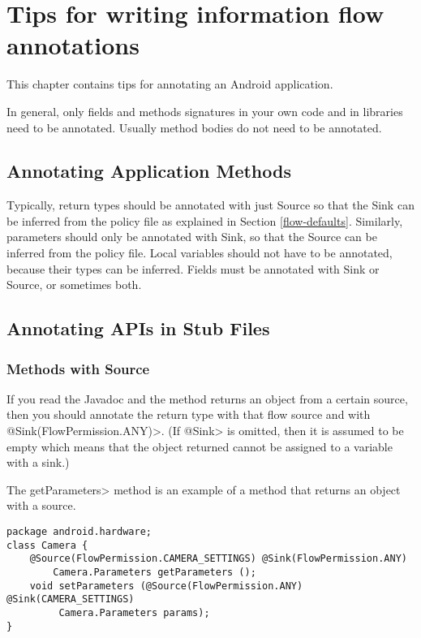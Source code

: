 \htmlhr
\chapter{Tips for writing information flow annotations\label{app-annotation}}

This chapter contains tips for annotating an Android application.

In general, only fields and methods signatures in your own code and in
libraries need to be annotated. Usually method bodies do not need to be
annotated.


\section{Annotating Application Methods\label{sec:annomethods}}

Typically, return types should be annotated with just Source so that the Sink can be
 inferred from the policy file as explained in Section \ref{flow-defaults}. Similarly, parameters should
  only be annotated with Sink, so that the Source can be inferred from  the policy file.
    Local variables should not have to be annotated, because their types can be inferred. Fields 
    must be annotated with  Sink or Source, or sometimes both. 

\section{Annotating APIs in Stub Files\label{sec:annoAPI}}

\subsection{Methods with Source}
If you read the Javadoc and the method returns an object from a certain source, then you should annotate
the return type with that flow source and with \<@Sink(FlowPermission.ANY)>.  (If \<@Sink> is omitted, then it is assumed to be empty
 which means that the object returned cannot be assigned to a variable with a sink.)

The \<getParameters> method is an example of a method that returns an object with a source.
\begin{Verbatim}
package android.hardware;
class Camera {
    @Source(FlowPermission.CAMERA_SETTINGS) @Sink(FlowPermission.ANY)
        Camera.Parameters getParameters ();
    void setParameters (@Source(FlowPermission.ANY) @Sink(CAMERA_SETTINGS) 
         Camera.Parameters params);
}
\end{Verbatim}



